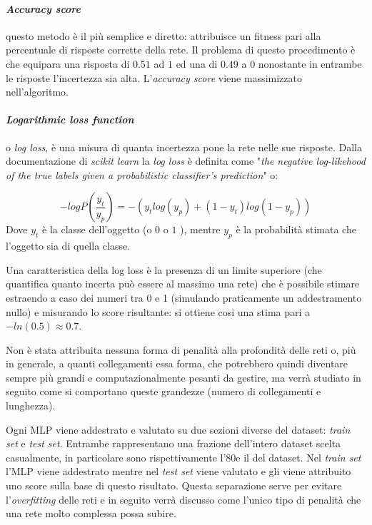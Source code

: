 \documentclass[12pt,a4paper]{report}
\begin{document}
\paragraph{\textit{Accuracy score}} questo metodo è il più semplice e diretto: attribuisce un fitness pari alla percentuale di risposte corrette della rete. Il problema di questo procedimento è che equipara una risposta di $0.51$ ad $1$ ed una di $0.49$ a $0$ nonostante in entrambe le risposte l'incertezza sia alta.
L'\textit{accuracy score} viene massimizzato nell'algoritmo.

\paragraph{\textit{Logarithmic loss function}} o \textit{log loss}, è una misura di quanta incertezza pone la rete nelle sue risposte. Dalla documentazione di \textit{scikit learn} la \textit{log loss} è definita come "\textit{the negative log-likehood of the true labels given a probabilistic classifier's prediction}" o:  

\begin{equation}
 -log P(\frac{y_{t}}{y_{p}}) = -(y_{t} log(y_{p}) + (1 - y_{t}) log(1 - y_{p}))
\end{equation}
Dove $y_{t}$ è la classe dell'oggetto (o $0$ o $1$ ), mentre $y_{p}$ è la probabilità stimata che l'oggetto sia di quella classe.

Una caratteristica della log loss è la presenza di un limite superiore (che quantifica quanto incerta può essere al massimo una rete) che è possibile stimare estraendo a caso dei numeri tra 0 e 1 (simulando praticamente un addestramento nullo) e misurando lo score risultante: si ottiene cosi una stima pari a  $-ln(0.5) \approx 0.7$.

Non è stata attribuita nessuna forma di penalità alla profondità delle reti o, più in generale, a quanti collegamenti essa forma, che potrebbero quindi diventare sempre più grandi e computazionalmente pesanti da gestire, ma verrà studiato in seguito come si comportano queste grandezze (numero di collegamenti e lunghezza). 

Ogni MLP viene addestrato e valutato su due sezioni diverse del dataset: \textit{train set} e \textit{test set}.
Entrambe rappresentano una frazione dell'intero dataset scelta casualmente, in particolare sono rispettivamente l'80\textdiscount e il \textdiscount del dataset.
Nel \textit{train set} l'MLP viene addestrato mentre nel \textit{test set} viene valutato e gli viene attribuito uno score sulla base di questo risultato. 
Questa separazione serve per evitare l'\textit{overfitting} delle reti e in seguito verrà discusso come l'unico tipo di penalità che una rete molto complessa possa subire.
\end{document}
